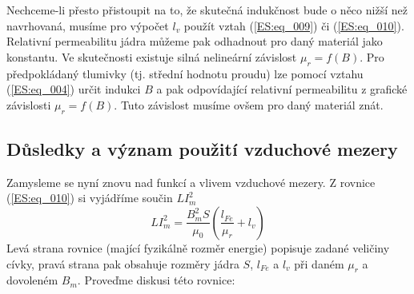       Nechceme-li přesto přistoupit na to, že skutečná indukčnost bude o něco nižší než navrhovaná,
      musíme pro výpočet \(l_v\) použít vztah (\ref{ES:eq_009}) či (\ref{ES:eq_010}). Relativní
      permeabilitu jádra můžeme pak odhadnout pro daný materiál jako konstantu. Ve skutečnosti
      existuje silná nelineární závislost \(\mu_r = f(B)\). Pro předpokládaný 
      tlumivky (tj. střední hodnotu proudu) lze pomocí vztahu (\ref{ES:eq_004}) určit indukci \(B\)
      a pak odpovídající relativní permeabilitu z grafické závislosti \(\mu_r = f(B)\). Tuto
      závislost musíme ovšem pro daný materiál znát.
      
    \subsection{Důsledky a význam použití vzduchové mezery}
      Zamysleme se nyní znovu nad funkcí a vlivem vzduchové mezery. Z rovnice (\ref{ES:eq_010}) si 
      vyjádříme součin \(LI_m^2\)
      \begin{equation}\label{ES:eq_012}
        LI_m^2 = \frac{B_m^2S}{\mu_0}\left(\frac{l_{Fe}}{\mu_r}+l_v\right)
      \end{equation}
      Levá strana rovnice (mající fyzikálně rozměr energie) popisuje zadané veličiny cívky, pravá 
      strana pak obsahuje rozměry jádra \(S\), \(l_{Fe}\) a \(l_v\) při daném \(\mu_r\) a dovoleném 
      \(B_m\). Proveďme diskusi této rovnice:
